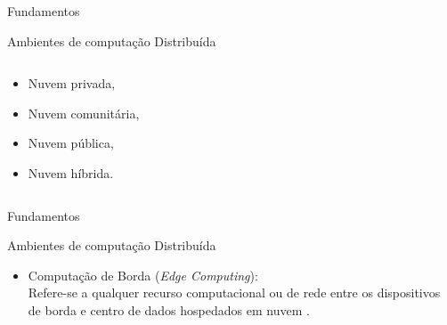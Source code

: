 \documentclass[aspectratio=43,10pt]{beamer}
\newcommand{\nota}[1]{\hspace*{-0.5cm}\textit{{\color[rgb]{1,0,0}Nota: #1}}}
\begin{document}
\begin{frame}[fragile]{Fundamentos}
\begin{alertblock}{Ambientes de computação Distribuída}
\begin{itemize}
\begin{columns}[T,onlytextwidth]
\begin{itemize}
      \begin{itemize}
        \item Nuvem privada,
        \item Nuvem comunitária,
        \item Nuvem pública,
        \item Nuvem híbrida.
      \end{itemize}
    \end{itemize}
  \end{columns}
\end{itemize}
\end{alertblock}
\end{frame}

\begin{frame}[fragile]{Fundamentos}
  \begin{alertblock}{Ambientes de computação Distribuída}
  \begin{itemize}
    
  \item Computação de Borda (\emph{Edge Computing}):
  \\ Refere-se a qualquer recurso computacional ou de rede entre os dispositivos
  de borda e centro de dados hospedados em nuvem \cite{Shi2016}.
\end{itemize}
\end{alertblock}
\end{frame}
\end{document}
